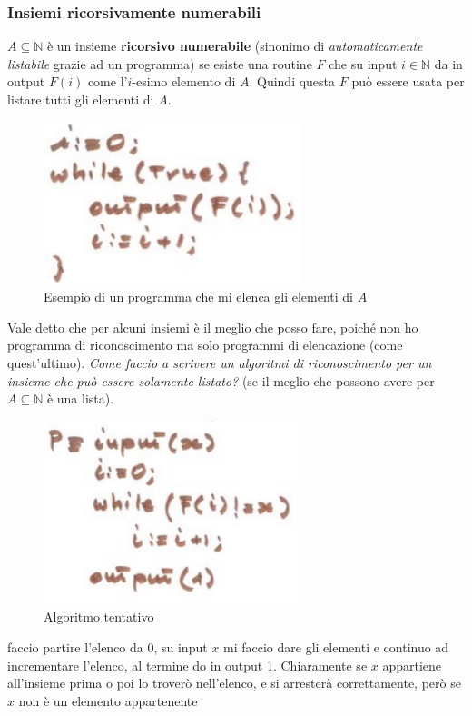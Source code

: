 \documentclass{article}
\begin{document}
\subsubsection{Insiemi ricorsivamente numerabili}
$A\subseteq\mathbb{N}$ è un insieme \textbf{ricorsivo numerabile} (sinonimo di \textit{automaticamente
    listabile} grazie ad un programma) se esiste una routine $F$ che su input $i\in\mathbb{N}$
da in output $F(i)$ come l'$i$-esimo elemento di $A$.
Quindi questa $F$ può essere usata per listare tutti gli elementi di $A$.
\begin{figure}[H]
    \centering
    \includegraphics[scale=0.6]{images/listare_A.png}
    \caption{Esempio di un programma che mi elenca gli elementi di $A$}
\end{figure}
Vale detto che per alcuni insiemi è il meglio che posso fare, poiché non ho programma di
riconoscimento ma solo programmi di elencazione (come quest'ultimo).
\textit{Come faccio a scrivere un algoritmi di riconoscimento per un insieme che può essere solamente
    listato?} (se il meglio che possono avere per $A\subseteq\mathbb{N}$ è una lista).
\begin{figure}[H]
    \centering
    \caption{Algoritmo tentativo}
    \includegraphics[scale=0.6]{images/a_non_ric_TENTATIVO.png}
\end{figure}
faccio partire l'elenco da 0, su input $x$ mi faccio dare gli elementi e continuo ad incrementare
l'elenco, al termine do in output 1. Chiaramente se $x$ appartiene all'insieme prima o poi lo
troverò nell'elenco, e si arresterà correttamente, però se $x$ non è un elemento appartenente
\end{document}
